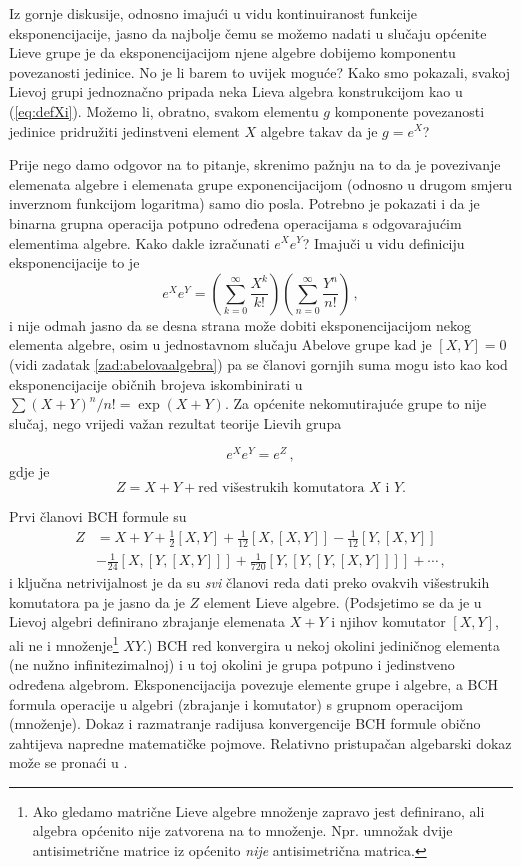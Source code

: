 Iz gornje diskusije, odnosno imajući u vidu kontinuiranost funkcije
eksponencijacije, jasno da najbolje čemu se možemo nadati u
slučaju općenite Lieve grupe je da
eksponencijacijom njene algebre dobijemo komponentu povezanosti
jedinice. No je li barem to uvijek moguće?
Kako smo pokazali, svakoj Lievoj grupi jednoznačno pripada neka Lieva algebra
konstrukcijom kao u (\ref{eq:defXi}). Možemo li, obratno, svakom
elementu $g$  komponente povezanosti jedinice pridružiti jedinstveni
element $X$ algebre takav da je $g = e^{X}$?

Prije nego damo odgovor na to pitanje, skrenimo pažnju na to da je
povezivanje elemenata algebre i elemenata grupe exponencijacijom
(odnosno u drugom smjeru inverznom funkcijom logaritma) samo dio
posla. Potrebno je pokazati i da je binarna grupna operacija potpuno
određena operacijama s odgovarajućim elementima algebre. Kako
dakle izračunati $e^X e^Y$? Imajuči u vidu definiciju eksponencijacije
to je
\begin{equation}
   e^X e^Y = \left(\sum_{k=0}^{\infty} \frac{X^k}{k!}\right)
             \left(\sum_{n=0}^{\infty} \frac{Y^n}{n!}\right)
    \,,
\end{equation}
i nije odmah jasno da se desna strana može dobiti eksponencijacijom nekog
elementa algebre, osim u jednostavnom slučaju Abelove grupe kad je 
$[X, Y]=0$ (vidi zadatak \ref{zad:abelovaalgebra}) pa se članovi
gornjih suma mogu isto kao kod eksponencijacije običnih brojeva
iskombinirati u $\sum (X+Y)^{n}/n! = \exp(X+Y)$. Za općenite
nekomutirajuće grupe to nije slučaj, nego vrijedi važan
rezultat teorije Lievih grupa
\begin{teorem}
    \[ e^X e^Y = e^Z \,, \]
  gdje je 
  \[ Z = X + Y + \text{red višestrukih komutatora $X$ i $Y$.} \]
\end{teorem}
Prvi članovi BCH formule su
\begin{align}
    Z& = X + Y + \frac{1}{2}[X, Y] + \frac{1}{12}[X, [X, Y]] 
       - \frac{1}{12}[Y, [X, Y]] \nonumber \\
     &   - \frac{1}{24}[X, [Y, [X, Y]]] + \frac{1}{720}[Y, [Y, [Y, [X, Y]]]] 
         + \cdots \,,
\end{align}
i ključna netrivijalnost je da su \emph{svi} članovi reda dati preko
ovakvih višestrukih komutatora pa je jasno da je $Z$ element Lieve algebre.
(Podsjetimo se da je u Lievoj algebri definirano zbrajanje elemenata $X+Y$ i njihov
 komutator $[X, Y]$, ali ne i množenje\footnote{Ako gledamo matrične
    Lieve algebre množenje zapravo jest definirano, ali algebra općenito nije zatvorena
    na to množenje. Npr. umnožak dvije antisimetrične matrice iz  
    općenito \emph{nije} antisimetrična matrica.} $X Y$.)
BCH red konvergira u nekoj okolini jediničnog elementa (ne nužno infinitezimalnoj)
i u toj okolini je grupa potpuno i jedinstveno određena algebrom.
Eksponencijacija povezuje elemente grupe i algebre, a BCH formula
operacije u algebri (zbrajanje i komutator) s grupnom operacijom (množenje).
Dokaz i razmatranje radijusa konvergencije BCH formule
obično zahtijeva napredne matematičke
pojmove. Relativno pristupačan algebarski dokaz može se pronaći
u \cite{Stilwell:2008}.

